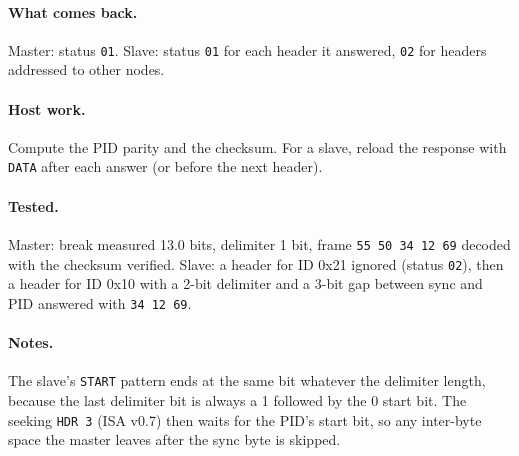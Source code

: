 \documentclass[11pt,a4paper]{article}
\newcommand{\sig}[1]{\texttt{#1}}
\begin{document}
\paragraph{What comes back.} Master: status \texttt{01}. Slave: status \texttt{01} for each header it answered, \texttt{02} for headers addressed to other nodes.

\paragraph{Host work.} Compute the PID parity and the checksum. For a slave, reload the response with \sig{DATA} after each answer (or before the next header).

\paragraph{Tested.} Master: break measured 13.0 bits, delimiter 1 bit, frame \texttt{55 50 34 12 69} decoded with the checksum verified. Slave: a header for ID 0x21 ignored (status \texttt{02}), then a header for ID 0x10 with a 2-bit delimiter and a 3-bit gap between sync and PID answered with \texttt{34 12 69}.
\paragraph{Notes.} The slave's \sig{START} pattern ends at the same bit whatever the delimiter length, because the last delimiter bit is always a 1 followed by the 0 start bit. The seeking \sig{HDR 3} (ISA v0.7) then waits for the PID's start bit, so any inter-byte space the master leaves after the sync byte is skipped.
\end{document}
